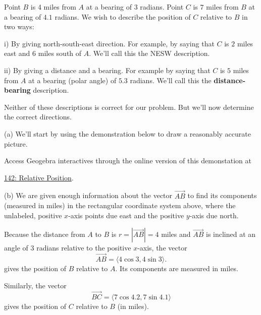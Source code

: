 \documentclass{ximera}
\begin{document}
\begin{example}  \label{Edsa5454v:Vectors}
Point $B$ is 4 miles from $A$ at a bearing of $3$ radians. Point $C$ is $7$ miles from $B$ at a bearing of $4.1$ radians. We wish to describe the position of $C$ relative to $B$ in two ways:

i) By giving north-south-east direction. For example, by saying that $C$ is $2$ miles east and $6$ miles south of $A$. We'll call this the NESW description.

ii) By giving a distance and a bearing. For example by saying that $C$ is $5$ miles from $A$ at a bearing (polar angle) of $5.3$ radians. We'll call this the {\bf distance-bearing} description.

Neither of these descriptions is correct for our problem. But we'll now determine the correct directions.

\begin{explanation}

(a) We'll start by using the demonstration below to draw a reasonably accurate picture. %


Access Geogebra interactives through the online version of this demonstation at
 
\href{https://www.geogebra.org/classic/bhdsgxtx}{142: Relative Position}.

 
\begin{onlineOnly}
    \begin{center}
\end{center}
\end{onlineOnly}


(b) We are given enough information about the vector $\overrightarrow{AB}$ to find its components (measured in miles) in the rectangular coordinate system above, where the unlabeled, positive $x$-axis points due east and the positive $y$-axis due north.

Because the distance from $A$ to $B$ is $r=  |\overrightarrow{AB}| = 4$ miles and $\overrightarrow{AB}$ is inclined at an angle of $3$ radians relative to the positive $x$-axis, the vector
\[
       \overrightarrow{AB} = \langle 4 \cos 3, 4 \sin 3\rangle .
\]
gives the position of $B$ relative to $A$. Its components are measured in miles.

Similarly, the vector
\[
   \overrightarrow{BC} = \langle 7 \cos 4.2, 7 \sin 4.1\rangle
\]
gives the position of $C$ relative to $B$ (in miles).


\end{explanation}
\end{example}
\end{document}
